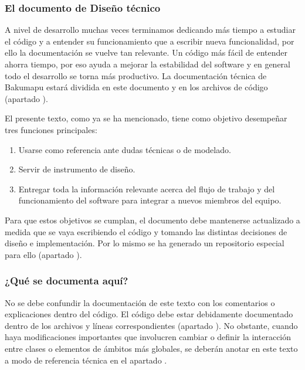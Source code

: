 \subsubsection{El documento de Diseño técnico}\label{flujo:documento-de-diseno}
A nivel de desarrollo muchas veces terminamos dedicando más tiempo a estudiar el código y a entender su funcionamiento que a escribir nueva funcionalidad, por ello la documentación se vuelve tan relevante. Un código más fácil de entender ahorra tiempo, por eso ayuda a mejorar la estabilidad del software y en general todo el desarrollo se torna más productivo. La documentación técnica de Bakumapu estará dividida en este documento y en los archivos de código (apartado ).

El presente texto, como ya se ha mencionado, tiene como objetivo desempeñar tres funciones principales:
\begin{enumerate}[noitemsep]
	\item Usarse como referencia ante dudas técnicas o de modelado.
	
	\item Servir de instrumento de diseño.
	
	\item Entregar toda la información relevante acerca del flujo de trabajo y del funcionamiento del software para integrar a nuevos miembros del equipo.
\end{enumerate}

Para que estos objetivos se cumplan, el documento debe mantenerse actualizado a medida que se vaya escribiendo el código y tomando las distintas decisiones de diseño e implementación. Por lo mismo se ha generado un repositorio especial para ello (apartado ). 

\subsubsection*{¿Qué se documenta aquí?}
No se debe confundir la documentación de este texto con los comentarios o explicaciones dentro del código. El código debe estar debidamente documentado dentro de los archivos y líneas correspondientes (apartado ). No obstante, cuando haya modificaciones importantes que involucren cambiar o definir la interacción entre clases o elementos de ámbitos más globales, se deberán anotar en este texto a modo de referencia técnica en el apartado .

